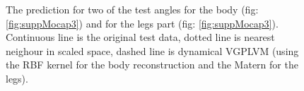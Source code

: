 \begin{figure}[ht]
\begin{center}
\end{center}
\caption{\small{
The prediction for two of the test angles for the body (fig: \ref{fig:suppMocap3}) and for the legs part (fig: \ref{fig:suppMocap3}). Continuous line is the original test data, dotted line is nearest neighour in scaled space, dashed line is dynamical VGPLVM (using the RBF kernel for the body reconstruction and the Matern for the legs).
}
}
\label{fig:supplMocap2}
\end{figure}





